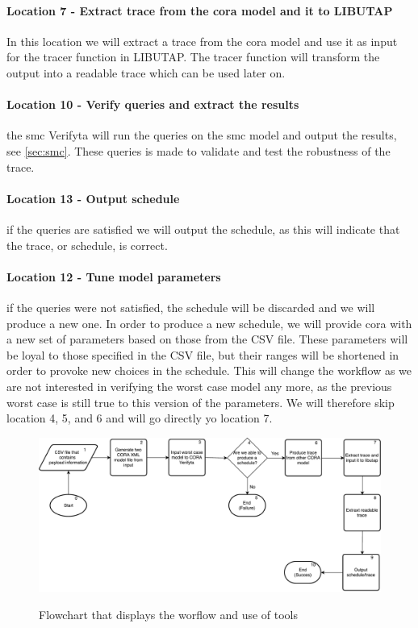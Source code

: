 \paragraph{Location 7 - Extract trace from the \gls{cora} model and it to LIBUTAP}
In this location we will extract a trace from the \gls{cora} model and use it as input for the tracer function in LIBUTAP. The tracer function will transform the output into a readable trace which can be used later on.


\paragraph{Location 10 - Verify queries and extract the results} the \gls{smc} Verifyta will run the queries on the \gls{smc} model and output the results, see \cref{sec:smc}. These queries is made to validate and test the robustness of the trace.

\paragraph{Location 13 - Output schedule} if the queries are satisfied we will output the schedule, as this will indicate that the trace, or schedule, is correct.

\paragraph{Location 12 - Tune model parameters} if the queries were not satisfied, the schedule will be discarded and we will produce a new one. In order to produce a new schedule, we will provide \gls{cora} with a new set of parameters based on those from the CSV file. These parameters will be loyal to those specified in the CSV file, but their ranges will be shortened in order to provoke new choices in the schedule. This will change the workflow as we are not interested in verifying the worst case model any more, as the previous worst case is still true to this version of the parameters. We will therefore skip location 4, 5, and 6 and will go directly yo location 7.

\begin{figure}
	\includegraphics[width=\textwidth]{graphics/tool1.pdf}
	\label{fig:tool1}
	\caption{Flowchart that displays the worflow and use of tools}
\end{figure}
